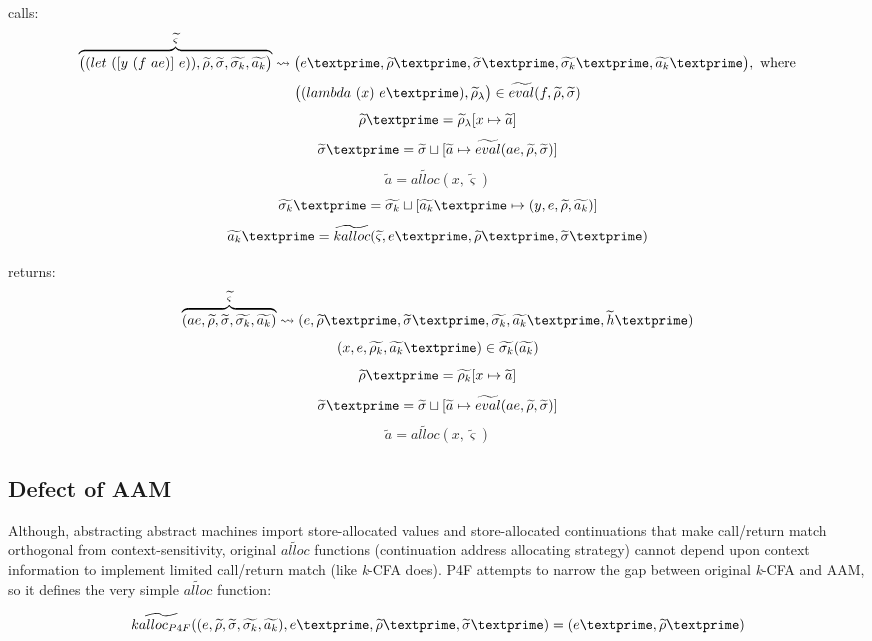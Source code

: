 \documentclass{article}
\begin{document}
calls:
\[
\overbrace{
\big((let\ ([y\ (f\ ae)]\ e)), \widetilde{\rho}, \widetilde{\sigma}, \widetilde{\sigma_k}, \widetilde{a_k} \big)
}^{\widetilde{\varsigma}}
\leadsto \big(e\textprime,\widetilde{\rho}\textprime, \widetilde{\sigma}\textprime, \widetilde{\sigma_k}\textprime, \widetilde{a_k}\textprime \big), \mbox{ where}
\]
\[
\big((lambda\ (x)\ e\textprime), \widetilde{\rho}_{\lambda}  \big) \in \widetilde{eval}(f, \widetilde{\rho}, \widetilde{\sigma})
\]
\[
\widetilde{\rho}\textprime = \widetilde{\rho}_{\lambda}[x \mapsto \widetilde{a}]
\]
\[
\widetilde{\sigma}\textprime = \widetilde{\sigma} \sqcup [\widetilde{a} \mapsto \widetilde{eval}(ae, \widetilde{\rho}, \widetilde{\sigma})]
\]
\[
\widetilde{a} = \widetilde{alloc}(x, \widetilde{\varsigma})
\]
\[
\widetilde{\sigma_k}\textprime = \widetilde{\sigma_k} \sqcup [\widetilde{a_k}\textprime \mapsto {(y, e, \widetilde{\rho}, \widetilde{a_k})}]
\]
\[
\widetilde{a_k}\textprime = \widetilde{kalloc}(\widetilde{\varsigma}, e\textprime, \widetilde{\rho}\textprime, \widetilde{\sigma}\textprime)
\]


returns:
\[
\overbrace{
(ae, \widetilde{\rho}, \widetilde{\sigma}, \widetilde{\sigma_k}, \widetilde{a_k})
}^{\widetilde{\varsigma}}
\leadsto (e, \widetilde{\rho}\textprime, \widetilde{\sigma}\textprime, \widetilde{\sigma_k}, \widetilde{a_k}\textprime, \widetilde{h}\textprime)
\]
\[
(x, e, \widetilde{\rho_k}, \widetilde{a_k}\textprime) \in \widetilde{\sigma_k}(\widetilde{a_k})
\]
\[
\widetilde{\rho}\textprime = \widetilde{\rho_k}[x \mapsto \widetilde{a}]
\]
\[
\widetilde{\sigma}\textprime = \widetilde{\sigma} \sqcup [\widetilde{a} \mapsto \widetilde{eval}(ae, \widetilde{\rho}, \widetilde{\sigma})]
\]
\[
\widetilde{a} = \widetilde{alloc}(x, \widetilde{\varsigma})
\]

\subsection{Defect of AAM}
\label{sub:Defect of AAM}
Although, abstracting abstract machines import store-allocated values and store-allocated continuations that make call/return match orthogonal from context-sensitivity, original $\widetilde{alloc}$ functions (continuation address allocating strategy) cannot depend upon context information to implement limited call/return match (like \textit{k}-CFA does). P4F attempts to narrow the gap between original \textit{k}-CFA and AAM, so it defines the very simple $\widetilde{alloc}$ function:

\[
\widetilde{kalloc_{P4F}} ((e, \widetilde{\rho}, \widetilde{\sigma}, \widetilde{\sigma_k}, \widetilde{a_k}), e\textprime, \widetilde{\rho}\textprime, \widetilde{\sigma}\textprime) = (e\textprime, \widetilde{\rho}\textprime)
\]
\end{document}
